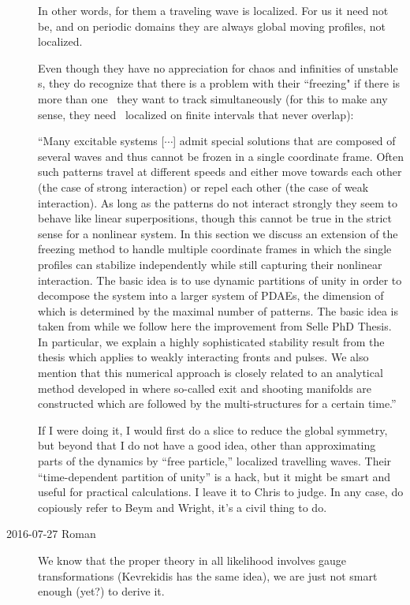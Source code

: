 \begin{description}
In other words, for them a traveling wave is localized. For us it need
not be, and on periodic domains they are always global moving profiles,
not localized.

Even though they have no appreciation for chaos and infinities of
unstable \rpo s, they do recognize that there is a problem with their
``freezing" if there is more than one \reqv\ they want to track
simultaneously (for this to make any sense, they need \reqva\ localized
on finite intervals that never overlap):

``Many excitable systems [$\cdots$] admit special solutions that are
composed of several waves and thus cannot be frozen in a single
coordinate frame. Often such patterns travel at different speeds and
either move towards each other (the case of strong interaction) or repel
each other (the case of weak interaction). As long as the patterns do not
interact strongly they seem to behave like linear superpositions, though
this cannot be true in the strict sense for a nonlinear system. In this
section we discuss an extension of the freezing method to handle multiple
coordinate frames in which the single profiles can stabilize
independently while still capturing their nonlinear interaction. The
basic idea is to use dynamic partitions of unity in order to decompose
the system into a larger system of PDAEs, the dimension of which is
determined by the maximal number of patterns. The basic idea is taken
from  while we follow here the improvement from
Selle PhD Thesis. In particular, we explain a highly sophisticated
stability result from the thesis which applies to weakly interacting
fronts and pulses. We also mention that this numerical approach is
closely related to an analytical method developed in
 where so-called exit and shooting manifolds
are constructed which are followed by the multi-structures for a certain
time.''

If I were doing it, I would first do a slice to reduce the global
symmetry, but beyond that I do not have a good idea, other than
approximating parts of the dynamics by ``free particle,'' localized
travelling waves. Their ``time-dependent partition of unity'' is a hack,
but it might be smart and useful for practical calculations. I leave it
to Chris to judge. In any case, do copiously refer to Beym and Wright,
it's a civil thing to do.


\item[2016-07-27 Roman]
We know that the proper theory in all likelihood involves gauge
transformations (Kevrekidis has the same idea), we are just not smart
enough (yet?) to derive it.


\end{description}
